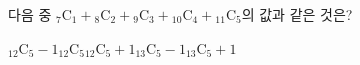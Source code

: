 다음 중 ${}_7\mathrm{C}_1+{}_8\mathrm{C}_2+{}_9\mathrm{C}_3+{}_{10}\mathrm{C}_4+{}_{11}\mathrm{C}_5$의 값과 같은 것은?
\begin{choices32}{${}_{12}\mathrm{C}_5-1$}{${}_{12}\mathrm{C}_5$}{${}_{12}\mathrm{C}_5+1$}{${}_{13}\mathrm{C}_5-1$}{${}_{13}\mathrm{C}_5+1$}\end{choices32}
